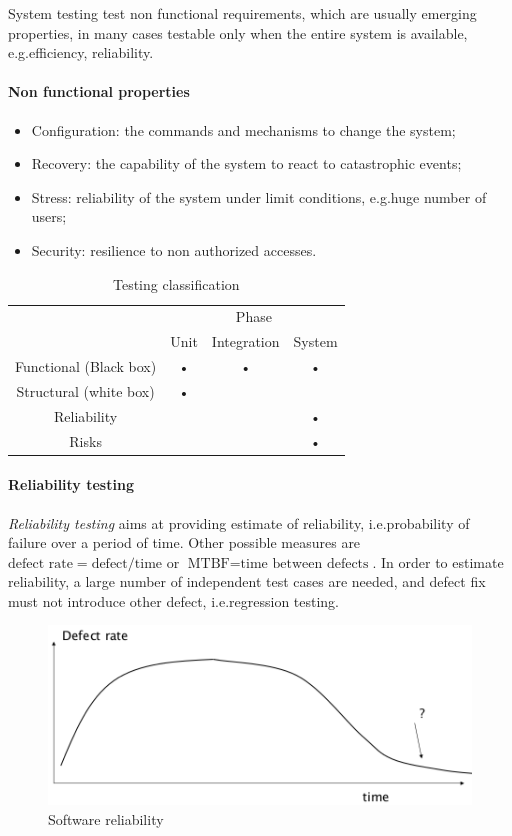\medskip

System testing test non functional requirements, which are usually emerging properties, in many cases testable only when the entire system is available, e.g.\@ efficiency, reliability.

\paragraph{Non functional properties}
\begin{itemize}
\item Configuration: the commands and mechanisms to change the system;
\item Recovery: the capability of the system to react to catastrophic events;
\item Stress: reliability of the system under limit conditions, e.g.\@ huge number of users;
\item Security: resilience to non authorized accesses.
\end{itemize}

\begin{table}
\centering
\begin{tabular}{|c|c|c|c|}
\hline 
 & \multicolumn{3}{c|}{Phase} \\ 
\cline{2-4} 
 & Unit & Integration & System \\ 
\hline 
Functional (Black box) & • & • & • \\ 
\hline 
Structural (white box) & • & & \\ 
\hline 
Reliability & & & • \\ 
\hline 
Risks & & & • \\ 
\hline 
\end{tabular} 
\caption{Testing classification}
\end{table}

\paragraph{Reliability testing}
\emph{Reliability testing} aims at providing estimate of reliability, i.e.\@ probability of failure over a period of time. Other possible measures are $\text{defect rate} = \text{defect}/\text{time}$ or $\text{MTBF} = \text{time between defects}$. In order to estimate reliability, a large number of independent test cases are needed, and defect fix must not introduce other defect, i.e.\@ regression testing.

\begin{figure}[hbtp]
\centering
\includegraphics[scale=0.4]{images/software_reliability.png}
\caption{Software reliability}
\end{figure}

